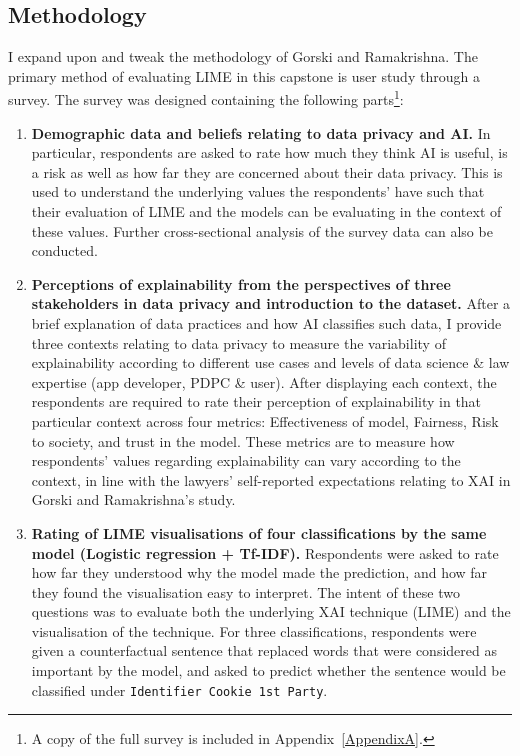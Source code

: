 \subsection{Methodology}
I expand upon and tweak the methodology of Gorski and Ramakrishna. The primary method of evaluating LIME in this capstone is user study through a survey. The survey was designed containing the following parts\footnote{A copy of the full survey is included in Appendix~\ref{AppendixA}.}:
\begin{enumerate}
	\item \textbf{Demographic data and beliefs relating to data privacy and AI.} In particular, respondents are asked to rate how much they think AI is useful, is a risk as well as how far they are concerned about their data privacy. This is used to understand the underlying values the respondents' have such that their evaluation of LIME and the models can be evaluating in the context of these values. Further cross-sectional analysis of the survey data can also be conducted.
	\item \textbf{Perceptions of explainability from the perspectives of three stakeholders in data privacy and introduction to the dataset.} After a brief explanation of data practices and how AI classifies such data, I provide three contexts relating to data privacy to measure the variability of explainability according to different use cases and levels of data science \& law expertise (app developer, PDPC \& user). After displaying each context, the respondents are required to rate their perception of explainability in that particular context across four metrics: Effectiveness of model, Fairness, Risk to society, and trust in the model. These metrics are to measure how respondents' values regarding explainability can vary according to the context, in line with the lawyers' self-reported expectations relating to XAI in Gorski and Ramakrishna's study.
	\item \textbf{Rating of LIME visualisations of four classifications by the same model (Logistic regression + Tf-IDF).} Respondents were asked to rate how far they understood why the model made the prediction, and how far they found the visualisation easy to interpret. The intent of these two questions was to evaluate both the underlying XAI technique (LIME) and the visualisation of the technique. For three classifications, respondents were given a counterfactual sentence that replaced words that were considered as important by the model, and asked to predict whether the sentence would be classified under \texttt{Identifier Cookie 1st Party}. 

\end{enumerate}
